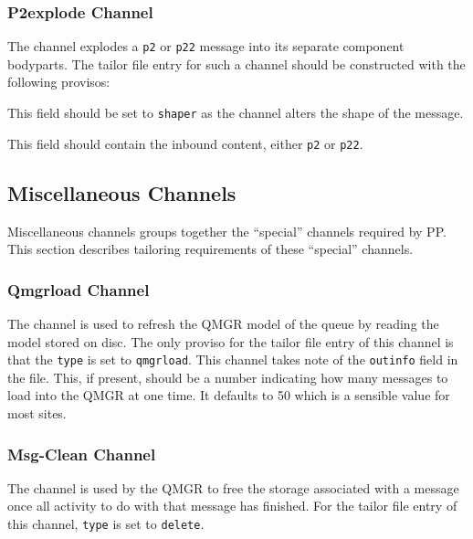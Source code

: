 \subsubsection	{P2explode Channel}

The  channel explodes a \verb|p2| or \verb|p22| message into its
separate component bodyparts.  The tailor file entry for such a
channel should be constructed with the following provisos:
\begin{describe}

\item[\verb+type+:] This field should be set to \verb+shaper+ as the
channel alters the shape of the message.

\item[\verb+content-in+:] This field should contain the inbound
content, either \verb+p2+ or \verb+p22+.

\end{describe}

\subsection      	{Miscellaneous Channels}

Miscellaneous channels groups together the ``special'' channels
required by PP.  This section describes tailoring requirements of
these ``special'' channels.

\subsubsection	{Qmgrload Channel}

The  channel is used to refresh the QMGR model of
the queue by reading the model stored on disc.  The only proviso for
the tailor file entry of this channel is that the
\verb+type+ is set to \verb+qmgrload+. This channel takes note of the
\verb|outinfo| field in the  file. This, if present, should be
a number indicating how many messages to load into the QMGR at
one time. It defaults to 50 which is a sensible value for most sites.

\subsubsection	{Msg-Clean Channel}

The  channel is used by the QMGR to free the
storage associated with a message once all activity to do with that
message has finished.  For the tailor file entry of this channel,
\verb+type+ is set to \verb+delete+.

